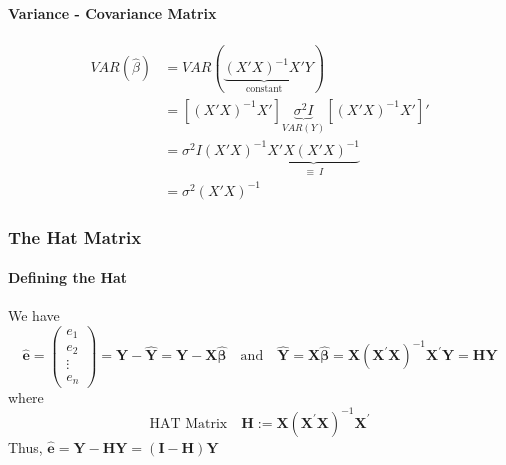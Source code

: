 \documentclass[10pt]{article}
\begin{document}
\paragraph{Variance - Covariance Matrix}
\begin{align*}
    VAR(\hat{\beta}) &= VAR( \underbrace{(X'X)^{-1}X'}_{\text{constant}}Y ) \\
    &= [(X'X)^{-1}X'] \underbrace{\sigma^2 I}_{VAR(Y)} [(X'X)^{-1}X']' \\
    &= \sigma^2 I (X'X)^{-1}  \underbrace{X'X (X'X)^{-1}}_{\equiv~I} \\
    &= \sigma^2 (X'X)^{-1} %
\end{align*}

\subsubsection{The Hat Matrix}
\paragraph{Defining the Hat}
We have
\begin{equation*}
    \widehat{\mathbf{e}}=\left(\begin{array}{c}{e_{1}} \\ {e_{2}} \\ {\vdots} \\ {e_{n}}\end{array}\right)=\mathbf{Y}-\widehat{\mathbf{Y}}=\mathbf{Y}-\mathbf{X} \widehat{\boldsymbol{\beta}} \quad \text{and} \quad  \widehat{\mathbf{Y}}=\mathbf{X} \widehat{\boldsymbol{\beta}}=\mathbf{X}\left(\mathbf{X}^{\prime} \mathbf{X}\right)^{-1} \mathbf{X}^{\prime} \mathbf{Y}=\mathbf{H} \mathbf{Y}
\end{equation*}
where
\begin{equation*}
    \text{HAT Matrix} \quad \mathbf{H} := \mathbf{X}\left(\mathbf{X}^{\prime} \mathbf{X}\right)^{-1} \mathbf{X}^{\prime}
\end{equation*}
Thus, $\widehat{\mathbf{e}}=\mathbf{Y}-\mathbf{H Y}=(\mathbf{I}-\mathbf{H}) \mathbf{Y}$
\end{document}
